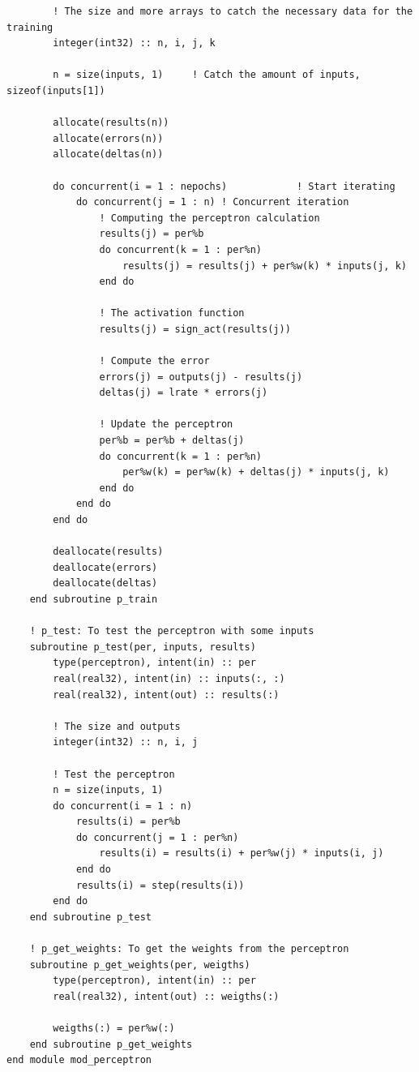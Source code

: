 \documentclass[12pt]{article}
\begin{document}
\begin{lstlisting}
        ! The size and more arrays to catch the necessary data for the training
        integer(int32) :: n, i, j, k
        
        n = size(inputs, 1)     ! Catch the amount of inputs, sizeof(inputs[1])

        allocate(results(n))
        allocate(errors(n))
        allocate(deltas(n))
        
        do concurrent(i = 1 : nepochs)            ! Start iterating
            do concurrent(j = 1 : n) ! Concurrent iteration
                ! Computing the perceptron calculation
                results(j) = per%b
                do concurrent(k = 1 : per%n)
                    results(j) = results(j) + per%w(k) * inputs(j, k)
                end do
                
                ! The activation function
                results(j) = sign_act(results(j))

                ! Compute the error 
                errors(j) = outputs(j) - results(j)
                deltas(j) = lrate * errors(j)

                ! Update the perceptron
                per%b = per%b + deltas(j)
                do concurrent(k = 1 : per%n)
                    per%w(k) = per%w(k) + deltas(j) * inputs(j, k)
                end do
            end do
        end do

        deallocate(results)
        deallocate(errors)
        deallocate(deltas)
    end subroutine p_train

    ! p_test: To test the perceptron with some inputs
    subroutine p_test(per, inputs, results)
        type(perceptron), intent(in) :: per
        real(real32), intent(in) :: inputs(:, :)
        real(real32), intent(out) :: results(:)

        ! The size and outputs
        integer(int32) :: n, i, j
        
        ! Test the perceptron
        n = size(inputs, 1)
        do concurrent(i = 1 : n)
            results(i) = per%b
            do concurrent(j = 1 : per%n)
                results(i) = results(i) + per%w(j) * inputs(i, j)
            end do
            results(i) = step(results(i))
        end do
    end subroutine p_test

    ! p_get_weights: To get the weights from the perceptron
    subroutine p_get_weights(per, weigths)
        type(perceptron), intent(in) :: per
        real(real32), intent(out) :: weigths(:)
        
        weigths(:) = per%w(:)
    end subroutine p_get_weights
end module mod_perceptron
\end{lstlisting}
\end{document}
